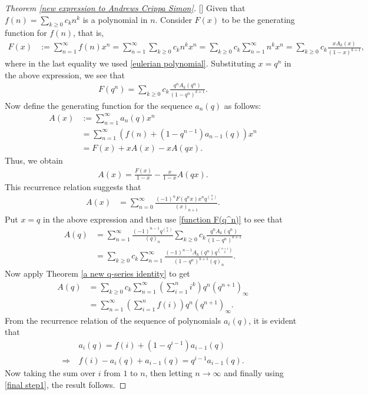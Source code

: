 \documentclass[11pt,reqno]{amsart}
\renewcommand{\(}{\left\(}
\renewcommand{\)}{\right\)}
\renewcommand{\[}{\left\[}
\renewcommand{\]}{\right\]}
\numberwithin{equation}{section}
\theoremstyle{plain}
\begin{document}
\begin{proof}[Theorem \ref{new expression to Andrews Crippa Simon}][]
Given that $f(n)=\sum_{k\geq 0} c_k n^k$ is a polynomial in $n$.  Consider $F(x)$ to be the generating function for $f(n)$,  that is,  
\begin{align*}
F(x)&:=\sum_{n=1}^\infty f(n)x^n = \sum_{n=1}^\infty \sum_{k\geq 0} c_k n^k x^n
=\sum_{k\geq 0} c_k \sum_{n=1}^\infty n^k x^n = \sum_{k\geq 0} c_k \frac{xA_k(x)}{(1-x)^{k+1}},
\end{align*}
where in the last equality we used \eqref{eulerian polynomial}.  
Substituting $x=q^n$ in the above expression, we see that 
\begin{align}\label{function F(q^n)}
F(q^n) = \sum_{k\geq 0} c_k\frac{q^nA_k(q^n)}{(1-q^n)^{k+1}}.
\end{align}
Now define the generating function for the sequence $a_n(q)$ as follows: 
\begin{align*}
A(x)&:=\sum_{n=1}^\infty a_n(q) x^n\\
&=\sum_{n=1}^\infty \left(f(n)+(1-q^{n-1})a_{n-1}(q)\right) x^n\\
&=F(x) + xA(x) - xA(qx).
\end{align*}
Thus,  we obtain
\begin{align*}
A(x)=\frac{F(x)}{1-x} - \frac{x}{1-x}A(qx).
\end{align*}
This recurrence relation suggests that 
\begin{align*}
A(x) &= \sum_{n=0}^\infty \frac{(-1)^{n} F(q^nx) x^n q^{n \choose 2}}{(x)_{n+1}}.
\end{align*}
Put $x=q$ in the above expression and then use \eqref{function F(q^n)} to  see that 
\begin{align*}
A(q)&=\sum_{n=1}^\infty \frac{(-1)^{n-1} q^{n \choose 2}}{(q)_{n}} \sum_{k\geq 0} c_k\frac{q^nA_k(q^n)}{(1-q^n)^{k+1}}\\
&=\sum_{k\geq 0} c_k \sum_{n=1}^\infty \frac{(-1)^{n-1} A_k(q^n) q^{n+1 \choose 2}}{(1-q^n)^{k+1}(q)_{n}}.
\end{align*}
Now apply Theorem \ref{a new q-series identity} to get
\begin{align}
A(q)&=\sum_{k\geq 0} c_k \sum_{n=1}^\infty \left(\sum_{i=1}^ni^k\right) q^n(q^{n+1})_\infty \nonumber \\
&=\sum_{n=1}^\infty \left(\sum_{i=1}^n f(i)\right) q^n(q^{n+1})_\infty.   \label{final step1}
\end{align}
From the recurrence relation of the sequence of polynomials $a_i(q)$,  it is evident that 
\begin{align*}
& a_i(q)=f(i)+(1-q^{i-1})a_{i-1}(q)\\
\Longrightarrow~ & f(i) - a_i(q) + a_{i-1}(q)  = q^{i-1}a_{i-1}(q).  
\end{align*}
Now taking the sum over $i$ from $1$ to $n$,  then letting $n \rightarrow \infty$ and finally using \eqref{final step1},  the result follows.  
\end{proof}
\end{document}
